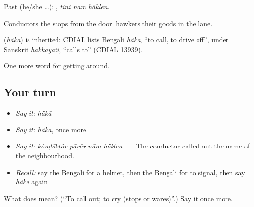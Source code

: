 Past (he/she …):   , \emph{tini nām hā̃klen}.

Conductors  the stops from the door; hawkers  their goods in the lane.

\begin{cousinweb}
\textbf{} (\emph{hā̃kā}) is inherited: CDIAL lists Bengali \emph{hā̃kā}, \textquotedblleft{}to call, to drive off\textquotedblright{}, under Sanskrit \emph{hakkayati}, \textquotedblleft{}calls to\textquotedblright{} (CDIAL 13939).
\end{cousinweb}

\begin{grammarlens}[title={What you've built}]
One more word for getting around.
\end{grammarlens}

\subsection*{Your turn}
\begin{itemize}
\raggedright
  \item \emph{Say it:} \emph{hā̃kā}
  \item \emph{Say it:} \emph{hā̃kā}, once more
  \item \emph{Say it:} \emph{kônḍākṭôr pāṛār nām hā̃klen.} — The conductor called out the name of the neighbourhood.
  \item \emph{Recall:} say the Bengali for a helmet, then the Bengali for to signal, then say \emph{hā̃kā} again
\end{itemize}

\begin{tcolorbox}[breakable,colback=teal!4,colframe=teal!35!black,title={Before you move on}]
What does  mean? (\textquotedblleft{}To call out; to cry (stops or wares)\textquotedblright{}.) Say it once more.
\end{tcolorbox}
